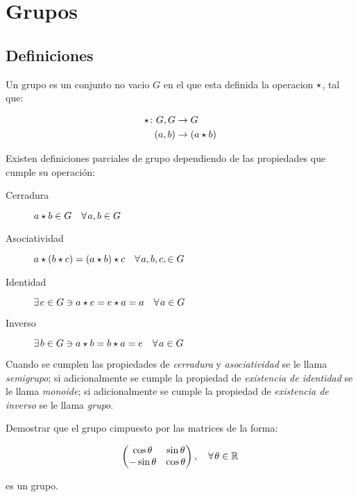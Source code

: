 
\section{Grupos}

    \subsection{Definiciones}

        \begin{definicion}
            Un grupo es un conjunto no vacio $G$ en el que esta definida la operacion $\star$, tal que:

            \begin{align}
                \star \colon G, G &\to G \nonumber \\
                (a, b) &\to (a \star b)
            \end{align}

            Existen definiciones parciales de grupo dependiendo de las propiedades que cumple su operación:

            \begin{description}
                \item [Cerradura] $a \star b \in G \quad \forall \mkern2mu a, b \in G$
                \item [Asociatividad] $a \star (b \star c) = (a \star b) \star c \quad \forall \mkern2mu a, b, c, \in G$
                \item [Identidad] $\exists\mkern2mu e \in G \ni a \star e = e \star a = a \quad \forall \mkern2mu a \in G$
                \item [Inverso] $\exists\mkern2mu b \in G \ni a \star b = b \star a = e \quad \forall \mkern2mu a \in G$
            \end{description}

            Cuando se cumplen las propiedades de \emph{cerradura} y \emph{asociatividad} se le llama \emph{semigrupo}; si adicionalmente se cumple la propiedad de \emph{existencia de identidad} se le llama \emph{monoide}; si adicionalmente se cumple la propiedad de \emph{existencia de inverso} se le llama \emph{grupo}.
        \end{definicion}

        \begin{ejercicio}
            Demostrar que el grupo cimpuesto por las matrices de la forma:

            \begin{equation*}
                \begin{pmatrix}
                    \cos{\theta} & \sin{\theta} \\
                    -\sin{\theta} & \cos{\theta}
                \end{pmatrix}, \quad \forall\mkern2mu \theta \in \mathbb{R}
            \end{equation*}

            es un grupo.
        \end{ejercicio}

